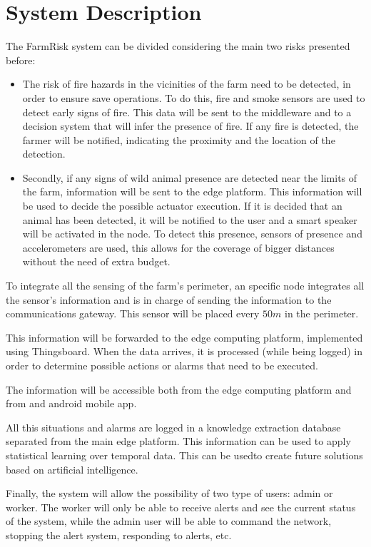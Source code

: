 \section{System Description}

The FarmRisk system can be divided considering the main two risks presented before:

\begin{itemize}
    \item The risk of fire hazards in the vicinities of the farm need to be detected, in order to ensure save operations. To do this, fire and smoke sensors are used to detect early signs of fire. This data will be 
    sent to the middleware and to a decision system that will infer the presence of fire. If any fire is detected, the farmer will be notified, indicating the proximity and the location of 
    the detection.
    \item Secondly, if any signs of wild animal presence are detected near the limits of the farm, information will be sent to the edge platform. This information will be used to decide the possible actuator execution. 
    If it is decided that an animal has been detected, it will be notified to the user and a smart speaker will be activated in the node. To detect this presence, sensors of presence and accelerometers are used, this allows for the coverage of bigger distances without the 
    need of extra budget.
\end{itemize}

To integrate all the sensing of the farm's perimeter, an specific node integrates all the sensor's information and is in charge of sending the information to the communications gateway. This sensor will be placed every $50m$ in the perimeter.

This information will be forwarded to the edge computing platform, implemented using Thingsboard. When the data arrives, it is processed (while being logged) in order to determine possible actions or alarms that need to be 
executed.

The information will be accessible both from the edge computing platform and from and android mobile app.

All this situations and alarms are logged in a knowledge extraction database separated from the main edge platform. This information can be used to apply statistical learning over temporal data. 
This can be usedto create future solutions based on artificial intelligence.

Finally, the system will allow the possibility of two type of users: admin or worker. The worker will only be able to receive alerts and see the current status of the system, while the admin user will be able to command the 
network, stopping the alert system, responding to alerts, etc.


